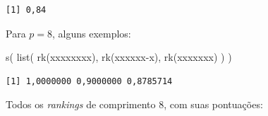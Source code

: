 \documentclass[
  letterpaper,
  DIV=11,
  numbers=noendperiod]{scrreprt}
\newenvironment{Shaded}{\begin{snugshade}}{\end{snugshade}}
\newcommand{\FunctionTok}[1]{\textcolor[rgb]{0.28,0.35,0.67}{#1}}
\newcommand{\NormalTok}[1]{\textcolor[rgb]{0.00,0.23,0.31}{#1}}
\newcommand{\StringTok}[1]{\textcolor[rgb]{0.13,0.47,0.30}{#1}}
\begin{document}
\begin{verbatim}
[1] 0,84
\end{verbatim}

Para $p = 8$, alguns exemplos:

\begin{Shaded}
\begin{Highlighting}[]
\FunctionTok{s}\NormalTok{(}
  \FunctionTok{list}\NormalTok{(}
    \FunctionTok{rk}\NormalTok{(}\StringTok{\textquotesingle{}xxxxxxxx\textquotesingle{}}\NormalTok{),}
    \FunctionTok{rk}\NormalTok{(}\StringTok{\textquotesingle{}xxxxxx{-}x\textquotesingle{}}\NormalTok{),}
    \FunctionTok{rk}\NormalTok{(}\StringTok{\textquotesingle{}{-}xxxxxxx\textquotesingle{}}\NormalTok{)}
\NormalTok{  )}
\NormalTok{)}
\end{Highlighting}
\end{Shaded}

\begin{verbatim}
[1] 1,0000000 0,9000000 0,8785714
\end{verbatim}

Todos os \emph{rankings} de comprimento $8$, com suas pontuações:
\end{document}
